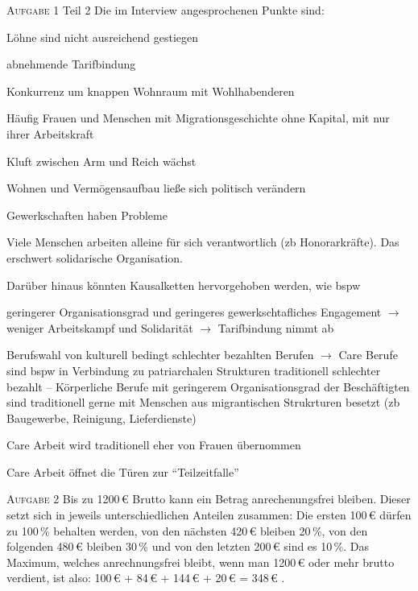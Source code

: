 \textsc{Aufgabe 1} Teil 2 \quad
Die im Interview angesprochenen Punkte sind:
\begin{myitemize}
    \item Löhne sind nicht ausreichend gestiegen
    \item abnehmende Tarifbindung
    \item Konkurrenz um knappen Wohnraum mit Wohlhabenderen
    \item Häufig Frauen und Menschen mit Migrationsgeschichte ohne Kapital, mit nur ihrer Arbeitskraft
    \item Kluft zwischen Arm und Reich wächst
    \item Wohnen und Vermögensaufbau ließe sich politisch verändern
    \item Gewerkschaften haben Probleme
    \item Viele Menschen arbeiten alleine für sich verantwortlich (\gls{zb} Honorarkräfte). Das erschwert solidarische Organisation.
\end{myitemize}

Darüber hinaus könnten Kausalketten hervorgehoben werden, wie \gls{bspw}
\begin{myitemize}
    \item geringerer Organisationsgrad und geringeres gewerkschtafliches Engagement $\rightarrow$ weniger Arbeitskampf und Solidarität $\rightarrow$ Tarifbindung nimmt ab
    \item Berufswahl von kulturell bedingt schlechter bezahlten Berufen $\rightarrow$ Care Berufe sind \gls{bspw} in Verbindung zu patriarchalen Strukturen traditionell schlechter bezahlt -- Körperliche Berufe mit geringerem Organisationsgrad der Beschäftigten sind traditionell gerne mit Menschen aus migrantischen Strukrturen besetzt (\gls{zb} Baugewerbe, Reinigung, Lieferdienste)
    \item Care Arbeit wird traditionell eher von Frauen übernommen
    \item Care Arbeit öffnet die Türen zur \enquote{Teilzeitfalle}
\end{myitemize}




\textsc{Aufgabe 2} \quad
Bis zu 1200\,€ Brutto kann ein Betrag anrechenungsfrei bleiben. Dieser setzt sich in jeweils unterschiedlichen Anteilen zusammen: Die ersten 100\,€ dürfen zu 100\,\% behalten werden, von den nächsten 420\,€ bleiben 20\,\%, von den folgenden 480\,€ bleiben 30\,\% und von den letzten 200\,€ sind es 10\,\%. Das Maximum, welches anrechnungsfrei bleibt, wenn man 1200\,€ oder mehr brutto verdient, ist also: 100\,€ + 84\,€ + 144\,€ + 20\,€ = 348\,€ \autocite[59-62]{MerkblattSGBII}. 

